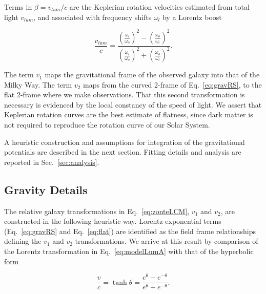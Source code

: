 \documentclass[reprint,%
 amsmath,amssymb,
 aps,
]{revtex4-1}
\begin{document}
Terms in 
$\beta = v_{lum}/c$ are the
Keplerian rotation velocities  estimated from total light  $v_{lum}$, and  associated with  frequency shifts $\omega_{l}$      by a Lorentz boost   

 \begin{equation}
 \frac{v_{lum} }{c}=
\frac{  \left( \frac{\omega_{l}}{\omega_o}\right)^2 -  \left( \frac{\omega_o}{\omega_{l}} \right)^2 }{  \left( \frac{\omega_{l}}{\omega_o}\right)^2  +  \left( \frac{\omega_o}{\omega_{l}}\right)^2 }. 
\label{eq:lumlorentz}
\end{equation} 
 
 
  
 
 
The   term $v_1$ maps the gravitational frame of the observed galaxy into that of the Milky Way. The   term $v_2$    maps from  the   curved 2-frame  of  Eq.~\ref{eq:gravRS},  to  the flat 2-frame where we make observations. 
  That this second transformation  is necessary is evidenced by the local constancy of the speed of light. 
  We assert that Keplerian rotation curves are     the best estimate of flatness, since dark matter is not required to  reproduce the rotation curve of our Solar System.
 
    
  
 
  A heuristic construction  and assumptions for integration of the gravitational potentials are described in the next section. Fitting details and analysis are reported in Sec.~\ref{sec:analysis}. 
   
 

 
 
\subsection{Gravity Details \label{sec:gravDets}}

 
    The relative galaxy transformations in   Eq.~\ref{eq:zonteLCM}, $v_1$ and $v_2$,  are
    constructed in  the following heuristic way.  
Lorentz exponential terms (Eq.~\ref{eq:gravRS} and Eq.~\ref{eq:flat})
  are    identified  as the field frame relationships defining the $v_1$ and $v_2$ transformations. We arrive at this result  by  comparison of 
     the  Lorentz transformation in  Eq.~\ref{eq:modelLumA} with 
 that of the    hyperbolic form \cite{rindler2013essential} 


     \begin{equation}
         \frac{v}{c} = \tanh \theta = \frac{e^\theta - e^{-\theta}}{e^\theta + e^{-\theta}} .   
         \label{boost}
     \end{equation} 
\end{document}
